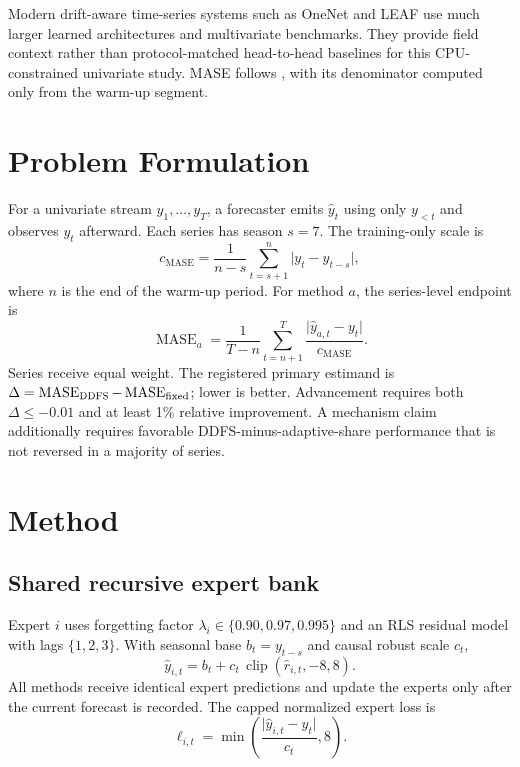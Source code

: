 \documentclass[10pt]{article}
\newcommand{\ddfs}{\textsc{DDFS}}
\newcommand{\mase}{\operatorname{MASE}}
\begin{document}
Modern drift-aware time-series systems such as OneNet \citep{zhang2023onenet} and
LEAF \citep{chen2025leaf} use much larger learned architectures and multivariate
benchmarks. They provide field context rather than protocol-matched head-to-head
baselines for this CPU-constrained univariate study. MASE follows
\citet{hyndman2006another}, with its denominator computed only from the warm-up
segment.

\section{Problem Formulation}

For a univariate stream $y_1,\ldots,y_T$, a forecaster emits $\hat y_t$ using only
$y_{<t}$ and observes $y_t$ afterward. Each series has season $s=7$. The
training-only scale is
\begin{equation}
  c_{\mathrm{MASE}} =
  \frac{1}{n-s}\sum_{t=s+1}^{n}\lvert y_t-y_{t-s}\rvert,
\end{equation}
where $n$ is the end of the warm-up period. For method $a$, the series-level
endpoint is
\begin{equation}
  \mase_a = \frac{1}{T-n}\sum_{t=n+1}^{T}
  \frac{\lvert \hat y_{a,t}-y_t\rvert}{c_{\mathrm{MASE}}}.
\end{equation}
Series receive equal weight. The registered primary estimand is
$\Delta=\mase_{\ddfs}-\mase_{\mathrm{fixed}}$; lower is better. Advancement
requires both $\Delta\leq -0.01$ and at least 1\% relative improvement. A mechanism
claim additionally requires favorable \ddfs-minus-adaptive-share performance that
is not reversed in a majority of series.

\section{Method}

\subsection{Shared recursive expert bank}

Expert $i$ uses forgetting factor
$\lambda_i\in\{0.90,0.97,0.995\}$ and an RLS residual model with lags
$\{1,2,3\}$. With seasonal base $b_t=y_{t-s}$ and causal robust scale $c_t$,
\begin{equation}
  \hat y_{i,t}=b_t+c_t\,
  \operatorname{clip}(\hat r_{i,t},-8,8).
\end{equation}
All methods receive identical expert predictions and update the experts only after
the current forecast is recorded. The capped normalized expert loss is
\begin{equation}
  \ell_{i,t}=\min\left(
    \frac{\lvert \hat y_{i,t}-y_t\rvert}{c_t},8
  \right).
\end{equation}
\end{document}
